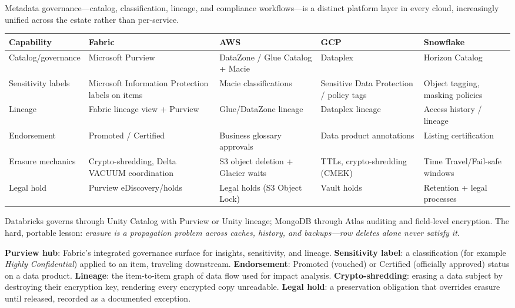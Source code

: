 \begin{crosscloud}
Metadata governance---catalog, classification, lineage, and compliance workflows---is a distinct platform layer in every cloud, increasingly unified across the estate rather than per-service.

\vspace{2mm}
{\footnotesize
\begin{tabular}{@{}p{2.8cm}p{3.2cm}p{3.2cm}p{3.2cm}p{3.2cm}@{}}
\toprule
\textbf{Capability} & \textbf{Fabric} & \textbf{AWS} & \textbf{GCP} & \textbf{Snowflake} \\
\midrule
Catalog/governance & Microsoft Purview & DataZone / Glue Catalog + Macie & Dataplex & Horizon Catalog \\
Sensitivity labels & Microsoft Information Protection labels on items & Macie classifications & Sensitive Data Protection / policy tags & Object tagging, masking policies \\
Lineage & Fabric lineage view + Purview & Glue/DataZone lineage & Dataplex lineage & Access history / lineage \\
Endorsement & Promoted / Certified & Business glossary approvals & Data product annotations & Listing certification \\
Erasure mechanics & Crypto-shredding, Delta VACUUM coordination & S3 object deletion + Glacier waits & TTLs, crypto-shredding (CMEK) & Time Travel/Fail-safe windows \\
Legal hold & Purview eDiscovery/holds & Legal holds (S3 Object Lock) & Vault holds & Retention + legal processes \\
\bottomrule
\end{tabular}}

\vspace{1mm}
Databricks governs through Unity Catalog with Purview or Unity lineage; MongoDB through Atlas auditing and field-level encryption. The hard, portable lesson: \emph{erasure is a propagation problem across caches, history, and backups---row deletes alone never satisfy it}.
\end{crosscloud}

\begin{keyterms}
\textbf{Purview hub}: Fabric's integrated governance surface for insights, sensitivity, and lineage. \quad
\textbf{Sensitivity label}: a classification (for example \emph{Highly Confidential}) applied to an item, traveling downstream. \quad
\textbf{Endorsement}: Promoted (vouched) or Certified (officially approved) status on a data product. \quad
\textbf{Lineage}: the item-to-item graph of data flow used for impact analysis. \quad
\textbf{Crypto-shredding}: erasing a data subject by destroying their encryption key, rendering every encrypted copy unreadable. \quad
\textbf{Legal hold}: a preservation obligation that overrides erasure until released, recorded as a documented exception.
\end{keyterms}

